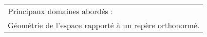 
\medskip

\begin{tabular}{|l|}\hline
Principaux domaines abordés :\\
Géométrie de l'espace rapporté à un repère orthonormé.\\ \hline
\end{tabular}

\bigskip

%
%
%
%
%

